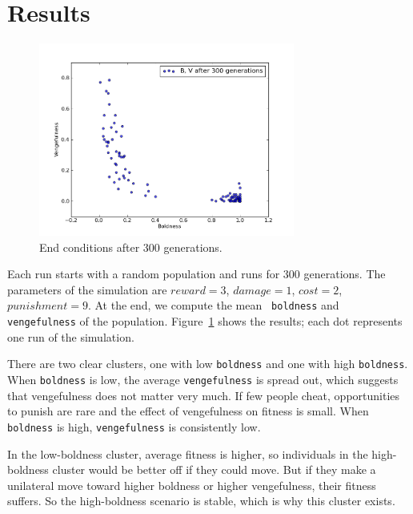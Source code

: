 \documentclass[10pt]{book}
\begin{document}
\section{Results}

\begin{figure}
  \begin{center}
    \includegraphics[width=0.75\textwidth]{figs/replicateNorms_stableBV_03.png}
  \end{center}
  \caption{End conditions after 300 generations.\label{fig.normsRep}}
\end{figure}

Each run starts with a random population and runs for 300 generations.
The parameters of the simulation are $reward = 3$, $damage = 1$, $cost
= 2$, $punishment = 9$.  At the end, we compute the mean {\tt
  boldness} and {\tt vengefulness} of the population.
Figure~\ref{fig.normsRep} shows the results; each dot represents one
run of the simulation.

There are two clear clusters, one with low \texttt{boldness} and one
with high \texttt{boldness}.  When \texttt{boldness} is low, the
average \texttt{vengefulness} is spread out, which suggests that
vengefulness does not matter very much.  If few people cheat,
opportunities to punish are rare and the effect of vengefulness on
fitness is small.  When \texttt{boldness} is high,
\texttt{vengefulness} is consistently low.

In the low-boldness cluster, average fitness is higher, so
individuals in the high-boldness cluster would be better off if they
could move.  But if they make a unilateral move toward higher
boldness or higher vengefulness, their fitness suffers.  So the
high-boldness scenario is stable, which is why this cluster exists.

\end{document}
